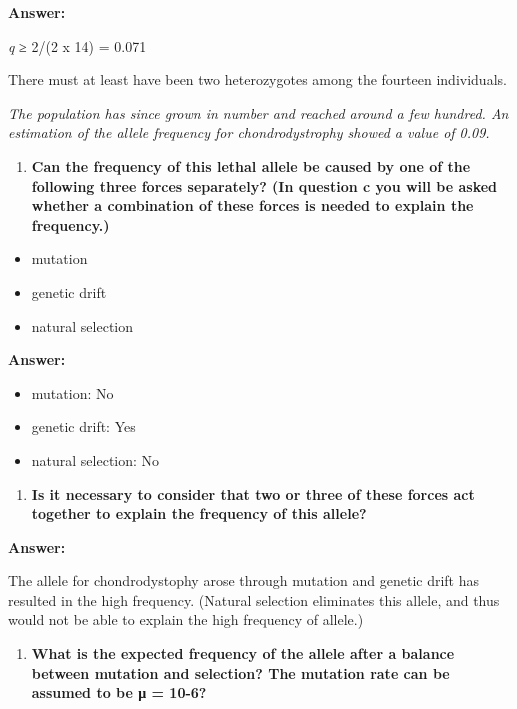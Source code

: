 \documentclass[]{article}
\providecommand{\tightlist}{%
  \setlength{\itemsep}{0pt}\setlength{\parskip}{0pt}}
\begin{document}
\textbf{Answer:}

\emph{q} ≥ 2/(2 x 14) = 0.071

There must at least have been two heterozygotes among the fourteen
individuals.

\emph{The population has since grown in number and reached around a few
hundred. An estimation of the allele frequency for chondrodystrophy
showed a value of 0.09.}

\begin{enumerate}
\def\labelenumi{\arabic{enumi})}
\setcounter{enumi}{1}
\tightlist
\item
  \textbf{Can the frequency of this lethal allele be caused by one of
  the following three forces separately? (In question c you will be
  asked whether a combination of these forces is needed to explain the
  frequency.)}
\end{enumerate}

\begin{itemize}
\tightlist
\item
  mutation
\item
  genetic drift
\item
  natural selection
\end{itemize}

\textbf{Answer:}

\begin{itemize}
\tightlist
\item
  mutation: No
\item
  genetic drift: Yes
\item
  natural selection: No
\end{itemize}

\begin{enumerate}
\def\labelenumi{\arabic{enumi})}
\setcounter{enumi}{2}
\tightlist
\item
  \textbf{Is it necessary to consider that two or three of these forces
  act together to explain the frequency of this allele?}
\end{enumerate}

\textbf{Answer:}

The allele for chondrodystophy arose through mutation and genetic drift
has resulted in the high frequency. (Natural selection eliminates this
allele, and thus would not be able to explain the high frequency of
allele.)

\begin{enumerate}
\def\labelenumi{\arabic{enumi})}
\setcounter{enumi}{3}
\tightlist
\item
  \textbf{What is the expected frequency of the allele after a balance
  between mutation and selection? The mutation rate can be assumed to be
  μ = 10-6?}
\end{enumerate}
\end{document}
